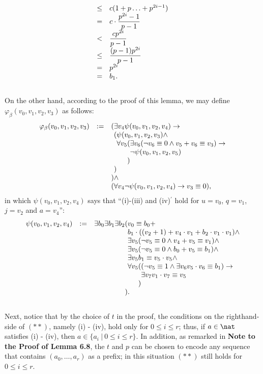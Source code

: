 \begin{enumerate}[1.]
\[\begin{array}{ll}
\leq & c (1 + p \ldots + p^{2i - 1}) \cr
=    & \displaystyle c \cdot \frac{p^{2i} - 1}{p - 1} \cr
<    & \displaystyle \frac{cp^{2i}}{p - 1} \cr
\leq & \displaystyle \frac{(p - 1)p^{2i}}{p - 1} \cr
=    & p^{2i} \cr
=    & b_1.
\end{array}
\]
\ \\
On the other hand, according to the proof of this lemma, we may define $\varphi_\beta (v_0, v_1, v_2, v_3)$ as follows:
\[
\begin{array}{lll}
\varphi_\beta (v_0, v_1, v_2, v_3) & := & (\exists v_4 \psi (v_0, v_1, v_2, v_4) \rightarrow \cr
\ & \ & \phantom{(} (\psi (v_0, v_1, v_2, v_3) \land \cr
\ & \ & \phantom{)(} \forall v_5 (\exists v_6 (\neg v_6 \equiv 0 \land v_5 + v_6 \equiv v_3) \rightarrow \cr
\ & \ & \phantom{)(\forall v_5)} \neg\psi (v_0, v_1, v_2, v_5) \cr
\ & \ & \phantom{(\forall v_5)} ) \cr
\ & \ & \phantom{(} ) \cr
\ & \ & )\land \cr
\ & \ & (\forall v_4 \neg\psi (v_0, v_1, v_2, v_4) \rightarrow v_3 \equiv 0),
\end{array}
\]
in which $\psi (v_0, v_1, v_2, v_4)$ says that ``(i)-(iii) and (iv)$^\prime$ hold for $u = v_0$, $q = v_1$, $j = v_2$ and $a = v_4$'':
\[
\begin{array}{lll}
\psi (v_0, v_1, v_2, v_4) & := & \exists b_0 \exists b_1 \exists b_2 ( v_0 \equiv b_0 + \cr
\ & \ & \phantom{\exists b_0 \exists b_1 \exists b_2 (} b_1 \cdot ((v_2 + 1) + v_4 \cdot v_1 + b_2 \cdot v_1 \cdot v_1) \land \cr
\ & \ & \phantom{\exists b_0 \exists b_1 \exists b_2 (} \exists v_5 (\neg v_5 \equiv 0 \land v_4 + v_5 \equiv v_1) \land \cr
\ & \ & \phantom{\exists b_0 \exists b_1 \exists b_2 (} \exists v_5 (\neg v_5 \equiv 0 \land b_0 + v_5 \equiv b_1) \land \cr
\ & \ & \phantom{\exists b_0 \exists b_1 \exists b_2 (} \exists v_5 b_1 \equiv v_5 \cdot v_5 \land \cr
\ & \ & \phantom{\exists b_0 \exists b_1 \exists b_2 (} \forall v_5 ((\neg v_5 \equiv 1 \land \exists v_6 v_5 \cdot v_6 \equiv b_1) \rightarrow \cr
\ & \ & \phantom{\exists b_0 \exists b_1 \exists b_2 (\forall v_5)} \exists v_7 v_1 \cdot v_7 \equiv v_5 \cr
\ & \ & \phantom{\exists b_0 \exists b_1 \exists b_2 (\forall v_5} ) \cr
\ & \ & \phantom{\exists b_0 \exists b_1 \exists b_2 } ).
\end{array}
\]
\ \\
Next, notice that by the choice of $t$ in the proof, the conditions on the righthand-side of $(**)$, namely (i) - (iv), hold only for $0 \leq i \leq r$; thus, if $a \in \nat$ satisfies (i) - (iv), then $a \in \{ a_i \ | \ 0 \leq i \leq r \}$. In addition, as remarked in \textbf{Note to the Proof of Lemma 6.8}, the $t$ and $p$ can be chosen to encode any sequence that contains $(a_0, \ldots, a_r)$ as a prefix; in this situation $(**)$ still holds for $0 \leq i \leq r$.\\

\end{enumerate}
